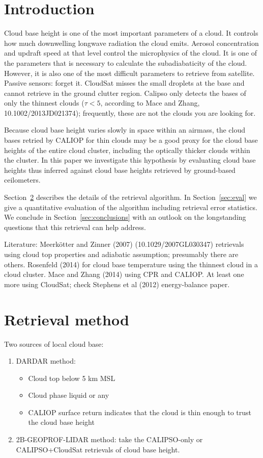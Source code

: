 \documentclass{article}
\begin{document}
\section{Introduction}
\label{sec:intro}
Cloud base height is one of the most important parameters of a cloud.  It
controls how much downwelling longwave radiation the cloud emits.  Aerosol
concentration and updraft speed at that level control the microphysics of the
cloud.  It is one of the parameters that is necessary to calculate the
subadiabaticity of the cloud.  However, it is also one of the most difficult
parameters to retrieve from satellite.  Passive sensors: forget it.  CloudSat
misses the small droplets at the base and cannot retrieve in the ground clutter
region.  Calipso only detects the bases of only the thinnest clouds ($\tau < 5$,
according to Mace and Zhang, 10.1002/2013JD021374); frequently, these are not
the clouds you are looking for.

Because cloud base height varies slowly in space within an airmass, the cloud
bases retried by CALIOP for thin clouds may be a good proxy for the cloud base
heights of the entire cloud cluster, including the optically thicker clouds
within the cluster.  In this paper we investigate this hypothesis by evaluating
cloud base heights thus inferred against cloud base heights retrieved by
ground-based ceilometers.  

Section~\ref{sec:retrieval} describes the details of the retrieval algorithm.
In Section~\ref{sec:eval} we give a quantitative evaluation of the algorithm
including retrieval error statistics.  We conclude in
Section~\ref{sec:conclusions} with an outlook on the longstanding questions that
this retrieval can help address.

Literature: Meerk\"otter and Zinner (2007) (10.1029/2007GL030347) retrievals
using cloud top properties and adiabatic assumption; presumably there are
others.  Rosenfeld (2014) for cloud base temperature using the thinnest cloud in
a cloud cluster.  Mace and Zhang (2014) using CPR and CALIOP.  At least one more
using CloudSat; check Stephens et al (2012) energy-balance paper.

\section{Retrieval method}
\label{sec:retrieval}
Two sources of local cloud base: 
\begin{enumerate}
\item DARDAR method:
  \begin{itemize}
  \item Cloud top below 5 km MSL
  \item Cloud phase liquid or any
  \item CALIOP surface return indicates that the cloud is thin enough to trust
    the cloud base height
  \end{itemize}
\item 2B-GEOPROF-LIDAR method:
take the CALIPSO-only or CALIPSO+CloudSat retrievals of cloud base height.
\end{enumerate}
\end{document}
